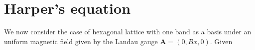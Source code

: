 \documentclass{report}
\begin{document}
\chapter{Harper's equation} \label{appendix C}
%
We now consider the case of hexagonal lattice with one band as a basis under an uniform magnetic field given by the Landau gauge $\mathbf{A} = (0, Bx,0)$. Given
\end{document}
